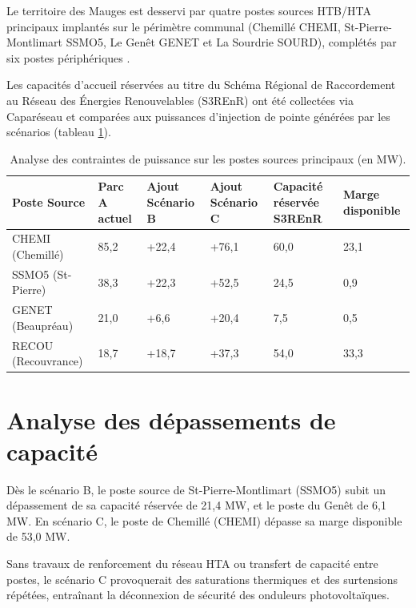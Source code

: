 \documentclass[12pt, a4paper]{report}
\begin{document}
Le territoire des Mauges est desservi par quatre postes sources HTB/HTA principaux implantés sur le périmètre communal (Chemillé CHEMI, St-Pierre-Montlimart SSMO5, Le Genêt GENET et La Sourdrie SOURD), complétés par six postes périphériques \cite{capareseau}.

Les capacités d'accueil réservées au titre du Schéma Régional de Raccordement au Réseau des Énergies Renouvelables (S3REnR) ont été collectées via Caparéseau \cite{capareseau} et comparées aux puissances d'injection de pointe générées par les scénarios (tableau \ref{tab:postes_sources}).

\begin{table}[H]
\centering
\caption{Analyse des contraintes de puissance sur les postes sources principaux (en MW).}
\label{tab:postes_sources}
\begin{tabularx}{\textwidth}{lXXXXX}
\toprule
Poste Source & Parc A actuel & Ajout Scénario B & Ajout Scénario C & Capacité réservée S3REnR & Marge disponible \\
\midrule
CHEMI (Chemillé) & 85,2 & +22,4 & +76,1 & 60,0 & 23,1 \\
SSMO5 (St-Pierre) & 38,3 & +22,3 & +52,5 & 24,5 & 0,9 \\
GENET (Beaupréau) & 21,0 & +6,6 & +20,4 & 7,5 & 0,5 \\
RECOU (Recouvrance) & 18,7 & +18,7 & +37,3 & 54,0 & 33,3 \\
\bottomrule
\end{tabularx}
\end{table}

\section{Analyse des dépassements de capacité}

Dès le scénario B, le poste source de St-Pierre-Montlimart (SSMO5) subit un dépassement de sa capacité réservée de 21,4 MW, et le poste du Genêt de 6,1 MW. En scénario C, le poste de Chemillé (CHEMI) dépasse sa marge disponible de 53,0 MW.

Sans travaux de renforcement du réseau HTA ou transfert de capacité entre postes, le scénario C provoquerait des saturations thermiques et des surtensions répétées, entraînant la déconnexion de sécurité des onduleurs photovoltaïques.


\end{document}
